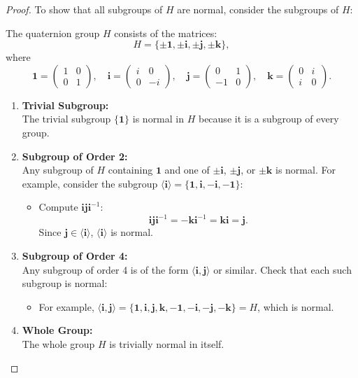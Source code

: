 \documentclass{article}
\begin{document}
\begin{proof}
To show that all subgroups of \( H \) are normal, consider the subgroups of \( H \):

The quaternion group \( H \) consists of the matrices:
\[
H = \{\pm \mathbf{1}, \pm \mathbf{i}, \pm \mathbf{j}, \pm \mathbf{k}\},
\]
where
\[
\mathbf{1} = \begin{pmatrix} 1 & 0 \\ 0 & 1 \end{pmatrix}, \quad
\mathbf{i} = \begin{pmatrix} i & 0 \\ 0 & -i \end{pmatrix}, \quad
\mathbf{j} = \begin{pmatrix} 0 & 1 \\ -1 & 0 \end{pmatrix}, \quad
\mathbf{k} = \begin{pmatrix} 0 & i \\ i & 0 \end{pmatrix}.
\]

\begin{enumerate}
    \item \textbf{Trivial Subgroup:} \\
    The trivial subgroup \( \{ \mathbf{1} \} \) is normal in \( H \) because it is a subgroup of every group.
    
    \item \textbf{Subgroup of Order 2:} \\
    Any subgroup of \( H \) containing \( \mathbf{1} \) and one of \( \pm \mathbf{i} \), \( \pm \mathbf{j} \), or \( \pm \mathbf{k} \) is normal. For example, consider the subgroup \( \langle \mathbf{i} \rangle = \{ \mathbf{1}, \mathbf{i}, -\mathbf{i}, -\mathbf{1} \} \):
    \begin{itemize}
        \item Compute \( \mathbf{i} \mathbf{j} \mathbf{i}^{-1} \):
        \[
        \mathbf{i} \mathbf{j} \mathbf{i}^{-1} = -\mathbf{k} \mathbf{i}^{-1} = \mathbf{k} \mathbf{i} = \mathbf{j}.
        \]
        Since \( \mathbf{j} \in \langle \mathbf{i} \rangle \), \( \langle \mathbf{i} \rangle \) is normal.
    \end{itemize}
    
    \item \textbf{Subgroup of Order 4:} \\
    Any subgroup of order 4 is of the form \( \langle \mathbf{i}, \mathbf{j} \rangle \) or similar. Check that each such subgroup is normal:
    \begin{itemize}
        \item For example, \( \langle \mathbf{i}, \mathbf{j} \rangle = \{\mathbf{1}, \mathbf{i}, \mathbf{j}, \mathbf{k}, -\mathbf{1}, -\mathbf{i}, -\mathbf{j}, -\mathbf{k}\} = H \), which is normal.
    \end{itemize}
    
    \item \textbf{Whole Group:} \\
    The whole group \( H \) is trivially normal in itself.
\end{enumerate}
\end{proof}
\end{document}
